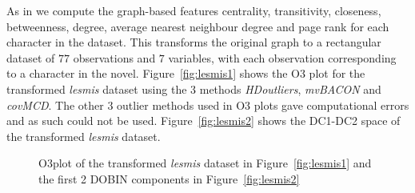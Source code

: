 \documentclass[11pt]{article}
\begin{document}
As in \cite{wilkinson2017visualizing} we compute the graph-based features centrality, transitivity, closeness, betweenness, degree, average nearest neighbour degree and page rank for each character in the dataset. This transforms the original graph to a rectangular dataset of $77$ observations and $7$ variables, with each observation corresponding to a character in the novel.  Figure~\ref{fig:lesmis1} shows the O3 plot for the transformed \textit{lesmis} dataset using the $3$ methods \textit{HDoutliers}, \textit{mvBACON} and \textit{covMCD}. The other $3$ outlier methods used in O3 plots gave computational errors and as such could not be used.  Figure~\ref{fig:lesmis2} shows the DC1-DC2 space of the transformed \textit{lesmis} dataset.  \\

\begin{figure}[!t]
	\centering
	\caption{O3plot of the transformed \textit{lesmis} dataset in Figure~\ref{fig:lesmis1} and the first 2 DOBIN components in Figure~\ref{fig:lesmis2} }
	\label{fig:lesmis}
\end{figure}
\end{document}
